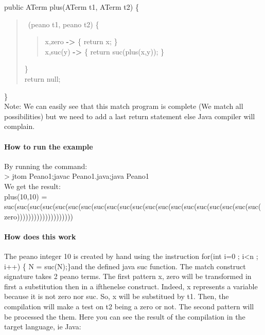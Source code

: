 public ATerm plus(ATerm t1, ATerm t2) \{\\
\begin{quote}
 \match\ (peano t1, peano t2) \{\\
\begin{quote}
  x,zero   \textbf{->} \{ return x; \}\\
  x,suc(y) \textbf{->} \{ return suc(plus(x,y)); \}\\
\end{quote}
  \}\\
  return null;\\
\end{quote}
\}\\

Note: We can easily see that this match program is complete (We match
all possibilities) but we need to add a last return statement else
Java compiler will complain.
\paragraph{How to run the example}
By running the command:
\\> jtom Peano1;javac Peano1.java;java Peano1
\\We get the result:
\\plus(10,10) = suc(suc(suc(suc(suc(suc(suc(suc(suc(suc(suc(suc(suc(suc(suc(suc(suc(suc(suc(suc(zero))))))))))))))))))))

\paragraph{How does this work}
The peano integer 10 is created by hand using the instruction
\textsf{for(int i=0 ; i<n ; i++) \{ N = suc(N);\}}and the defined java
suc function.
The match construct signature takes 2 peano terms. The first pattern
{x, zero} will be transformed in first a substitution then in a
ifthenelse construct. Indeed, x represents a variable because it is
not zero nor suc. So, x will be substitued by t1. Then, the
compilation will make a test on t2 being a zero or not. The second
pattern will be processed the them.
Here you can see the result of the compilation in the target language,
ie Java:

